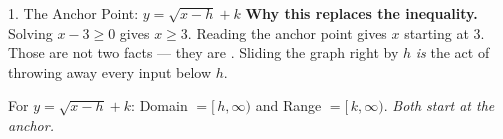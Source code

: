 \documentclass[10pt]{article}
\begin{document}
\begin{notesbox}{1. The Anchor Point: $y=\sqrt{x-h}+k$}
\vspace{2pt}
\textbf{Why this replaces the inequality.} Solving $x-3\ge0$ gives $x\ge 3$. Reading the anchor
point gives $x$ starting at $3$. Those are not two facts --- they are . Sliding the
graph right by $h$ \emph{is} the act of throwing away every input below $h$.
\begin{center}
\begin{tcolorbox}[colback=forestbg, colframe=forest, boxrule=0.7pt, arc=1.5mm, width=0.92\linewidth,
    left=3mm, right=3mm, top=1.5mm, bottom=1.5mm]
\centering\small
For $y=\sqrt{x-h}+k$: \quad Domain $=[\,h,\infty)$ \quad and \quad Range $=[\,k,\infty)$.
\emph{Both start at the anchor.}
\end{tcolorbox}
\end{center}
\end{notesbox}
\end{document}
